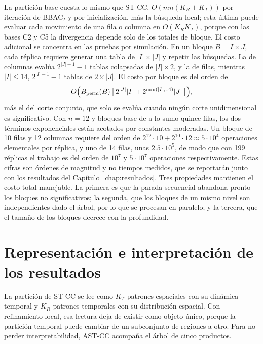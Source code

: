 La partición base cuesta lo mismo que ST-CC, $O(mn(K_R+K_T))$ por iteración de
BBAC$_I$ y por inicialización, más la búsqueda local; esta última puede evaluar
cada movimiento de una fila o columna en $O(K_R K_T)$, porque con las bases C2 y
C5 la divergencia depende solo de los totales de bloque. El costo adicional se
concentra en las pruebas por simulación. En un bloque $B=I\times J$, cada
réplica requiere generar una tabla de $|I|\times|J|$ y repetir las búsquedas. La
de columnas evalúa $2^{|J|-1}-1$ tablas colapsadas de $|I|\times2$, y la de
filas, mientras $|I|\le 14$, $2^{|I|-1}-1$ tablas de $2\times|J|$. El costo por
bloque es del orden de
\[
  O\Bigl(B_{\mathrm{perm}}(B)\,\bigl[\,2^{|J|}|I| + 2^{\min(|I|,14)}|J|\,\bigr]\Bigr),
\]
más el del corte conjunto, que solo se evalúa cuando ningún corte
unidimensional es significativo. Con $n=12$ y bloques base de a lo sumo quince
filas, los dos términos exponenciales están acotados por constantes moderadas. Un
bloque de 10 filas y 12 columnas requiere del orden de $2^{12}\cdot10+2^{10}\cdot12
\approx 5\cdot10^4$ operaciones elementales por réplica, y uno de 14 filas, unas
$2.5\cdot10^5$, de modo que con 199 réplicas el trabajo es del orden de $10^7$ y
$5\cdot10^7$ operaciones respectivamente. Estas cifras son órdenes de magnitud y
no tiempos medidos, que se reportarán junto con los resultados del
Capítulo~\ref{chap:resultados}.
Tres propiedades mantienen el costo total manejable. La primera es que la parada
secuencial abandona pronto los bloques no significativos; la segunda, que los
bloques de un mismo nivel son independientes dado el árbol, por lo que se
procesan en paralelo; y la tercera, que el tamaño de los bloques decrece con la
profundidad.

\section{Representación e interpretación de los resultados}\label{sec:prop-representacion}

La partición de ST-CC se lee como $K_T$ patrones espaciales con su dinámica
temporal y $K_R$ patrones temporales con su distribución espacial. Con
refinamiento local, esa lectura deja de existir como objeto único, porque la
partición temporal puede cambiar de un subconjunto de regiones a otro. Para no
perder interpretabilidad, AST-CC acompaña el árbol de cinco productos.

